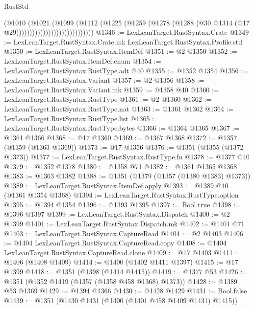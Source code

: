\begin{lexlean}{RustStd}
\begin{coremodule}
                                          (@1010
                                            (@1021
                                              (@1099
                                                (@1112
                                                  (@1225
                                                    (@1259
                                                      (@1278
                                                        (@1288
                                                          (@30
                                                            @1314
                                                            (@17 @29)))))))))))))))))))))))))))))
@1346 := LexLeanTarget.RustSyntax.Crate
@1349 := LexLeanTarget.RustSyntax.Crate.mk LexLeanTarget.RustSyntax.Profile.std
@1350 := LexLeanTarget.RustSyntax.ItemDef
@1351 := @2 @1350
@1352 := LexLeanTarget.RustSyntax.ItemDef.enum
@1354 := LexLeanTarget.RustSyntax.RustType.adt @40
@1355 := @1352 @1354
@1356 := LexLeanTarget.RustSyntax.Variant
@1357 := @2 @1356
@1358 := LexLeanTarget.RustSyntax.Variant.mk
@1359 := @1358 @40
@1360 := LexLeanTarget.RustSyntax.RustType
@1361 := @2 @1360
@1362 := LexLeanTarget.RustSyntax.RustType.nat
@1363 := @1361 @1362
@1364 := LexLeanTarget.RustSyntax.RustType.list
@1365 := LexLeanTarget.RustSyntax.RustType.bytes
@1366 := @1364 @1365
@1367 := @1361 @1366
@1368 := @17 @1360
@1369 := @1367 @1368
@1372 := @1357 (@1359 (@1363 @1369))
@1373 := @17 @1356
@1376 := @1351 (@1355 (@1372 @1373))
@1377 := LexLeanTarget.RustSyntax.RustType.fn
@1378 := @1377 @40
@1379 := @1352 @1378
@1380 := @1358 @71
@1382 := @1361 @1365 @1368
@1383 := @1363 @1382
@1388 := @1351 (@1379 (@1357 (@1380 @1383) @1373))
@1389 := LexLeanTarget.RustSyntax.ItemDef.apply
@1393 := @1389 @40 (@1361 @1354 @1368)
@1394 := LexLeanTarget.RustSyntax.RustType.option
@1395 := @1394 @1354
@1396 := @1393 @1395
@1397 := Bool.true
@1398 := @1396 @1397
@1399 := LexLeanTarget.RustSyntax.Dispatch
@1400 := @2 @1399
@1401 := LexLeanTarget.RustSyntax.Dispatch.mk
@1402 := @1401 @71
@1403 := LexLeanTarget.RustSyntax.CaptureRead
@1404 := @2 @1403
@1406 := @1404 LexLeanTarget.RustSyntax.CaptureRead.copy
@1408 := @1404 LexLeanTarget.RustSyntax.CaptureRead.clone
@1409 := @17 @1403
@1411 := @1406 (@1408 @1409)
@1414 := @1400 (@1402 @1411 @1397)
@1415 := @17 @1399
@1418 := @1351 (@1398 (@1414 @1415))
@1419 := @1377 @53
@1426 := @1351 (@1352 @1419 (@1357 (@1358 @458 @1368) @1373))
@1428 := @1389 @53 @1369
@1429 := @1394 @1366
@1430 := @1428 @1429
@1431 := Bool.false
@1439 := @1351 (@1430 @1431 (@1400 (@1401 @458 @1409 @1431) @1415))

\end{coremodule}
\end{lexlean}
